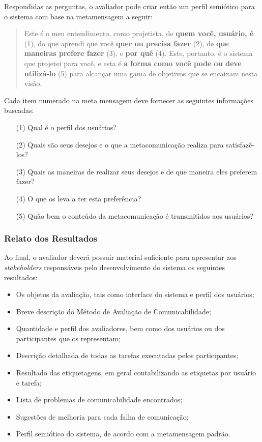 \indent Respondidas as perguntas, o avaliador pode criar então um perfil semiótico para o sistema com base na metamensagem a seguir:

\begin{quote}
Este é o meu entendimento, como projetista, de \textbf{quem você, usuário, é} (1), do que aprendi que você \textbf{quer ou precisa fazer} (2), de \textbf{que maneiras prefere fazer} (3), e \textbf{por quê} (4). Este, portanto, é o sistema que projetei para você, e esta é \textbf{a forma como você pode ou deve utilizá-lo} (5) para alcançar uma gama de objetivos que se encaixam nesta visão.
\end{quote}

\indent Cada item numerado na meta mensagem deve fornecer as seguintes informações buscadas:

\begin{itemize}
\item[(1)] Qual é o perfil dos usuários?
\item[(2)] Quais são seus desejos e o que a metacomunicação realiza para satisfazê-los?
\item[(3)] Quais as maneiras de realizar seus desejos e de que maneira eles preferem fazer?
\item[(4)] O que os leva a ter esta preferência?
\item[(5)] Quão bem o conteúdo da metacomunicação é transmitidos aos usuários?
\end{itemize}


\subsubsection{Relato dos Resultados}

\indent Ao final, o avaliador deverá possuir material suficiente para apresentar aos \textit{stakeholders} responsáveis pelo desenvolvimento do sistema os seguintes resultados:

\begin{itemize}
\item Os objetos da avaliação, tais como interface do sistema e perfil dos usuários;
\item Breve descrição do Método de Avaliação de Comunicabilidade;
\item Quantidade e perfil dos avaliadores, bem como dos usuários ou dos participantes que os representam;
\item Descrição detalhada de todas as tarefas executadas pelos participantes;
\item Resultado das etiquetagens, em geral contabilizando as etiquetas por usuário e tarefa;
\item Lista de problemas de comunicabilidade encontrados;
\item Sugestões de melhoria para cada falha de comunicação;
\item Perfil semiótico do sistema, de acordo com a metamensagem padrão.
\end{itemize}




